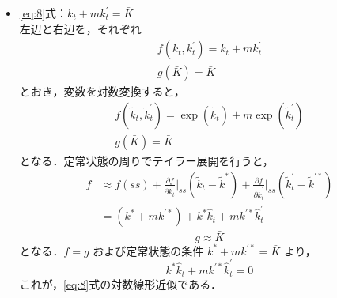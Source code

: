 \documentclass[dvipdfmx]{jlreq}
\begin{document}
\begin{itemize}
  \item \eqref{eq:8}式：$k_t + m k^\prime_t = \bar{K}$ \\
    左辺と右辺を，それぞれ
    \begin{gather}
      f(k_t, k^\prime_t) = k_t + m k^\prime_t \\
      g(\bar{K}) = \bar{K}
    \end{gather}
    とおき，変数を対数変換すると，
    \begin{gather}
      f(\widetilde{k}_t, \widetilde{k}^\prime_t) = \exp(\widetilde{k}_t) + m \exp(\widetilde{k}^\prime_t) \\
      g(\bar{K}) = \bar{K}
    \end{gather}
    となる．定常状態の周りでテイラー展開を行うと，
    \begin{equation}
      \begin{split}
        f &\approx f(ss) + \frac{\partial f}{\partial \widetilde{k}_t} \bigg|_{ss} (\widetilde{k}_t - \widetilde{k}^*) + \frac{\partial f}{\partial \widetilde{k}^\prime_t} \bigg|_{ss} (\widetilde{k}^\prime_t - \widetilde{k}^{\prime *}) \\
        &= (k^* + m k^{\prime *}) + k^* \widehat{k}_t + m k^{\prime *} \widehat{k}^\prime_t
      \end{split}
    \end{equation}
    \begin{equation}
      g \approx \bar{K}
    \end{equation}
    となる．$f=g$ および定常状態の条件 $k^* + m k^{\prime *} = \bar{K}$ より，
    \begin{equation}
      k^* \widehat{k}_t + m k^{\prime *} \widehat{k}^\prime_t = 0
    \end{equation}
    これが，\eqref{eq:8}式の対数線形近似である．
\end{itemize}
\end{document}
